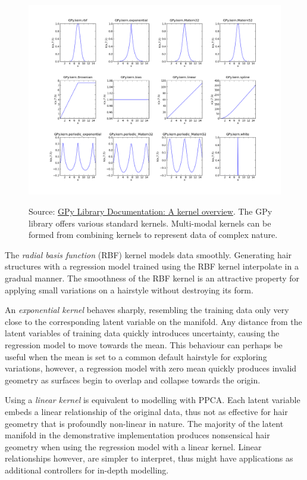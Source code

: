 \documentclass[ %
author={Dillon Keith Diep},
supervisor={Dr. Carl Henrik Ek},
degree={MEng},
title={ART-CG Hair:},
subtitle={Assisted Real-time Content Generation of Stylised Virtual Hair},
type={Research},
year={2017} ]{dissertation}
\begin{document}
\begin{figure}[!h]
	\centering
	\includegraphics[scale=0.4]{images/gpyKernels}\\
	\caption{Source: \href{http://gpytest2.readthedocs.io/en/latest/tuto_kernel_overview.html}{GPy Library Documentation: A kernel overview}. The GPy library offers various standard kernels. Multi-modal kernels can be formed from combining kernels to represent data of complex nature.}
	\label{kernels}
\end{figure}

The \textit{radial basis function} (RBF) kernel models data smoothly. Generating hair structures with a regression model trained using the RBF kernel interpolate in a gradual manner. The smoothness of the RBF kernel is an attractive property for applying small variations on a hairstyle without destroying its form.

An \textit{exponential kernel} behaves sharply, resembling the training data only very close to the corresponding latent variable on the manifold. Any distance from the latent variables of training data quickly introduces uncertainty, causing the regression model to move towards the mean. This behaviour can perhaps be useful when the mean is set to a common default hairstyle for exploring variations, however, a regression model with zero mean quickly produces invalid geometry as surfaces begin to overlap and collapse towards the origin.

Using a \textit{linear kernel} is equivalent to modelling with PPCA. Each latent variable embeds a linear relationship of the original data, thus not as effective for hair geometry that is profoundly non-linear in nature. The majority of the latent manifold in the demonstrative implementation produces nonsensical hair geometry when using the regression model with a linear kernel. Linear relationships however, are simpler to interpret, thus might have applications as additional controllers for in-depth modelling.
\end{document}
